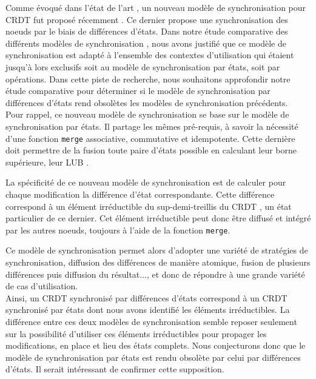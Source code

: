 \label{sec:perspective-comparison-sync-models}
Comme évoqué dans l'état de l'art , un nouveau modèle de synchronisation pour \ac{CRDT} fut proposé récemment \cite{almeida2015delta}.
Ce dernier propose une synchronisation des noeuds par le biais de différences d'états.
Dans notre étude comparative des différents modèles de synchronisation , nous avons justifié que ce modèle de synchronisation est adapté à l'ensemble des contextes d'utilisation qui étaient jusqu'à lors exclusifs soit au modèle de synchronisation par états, soit par opérations.
Dans cette piste de recherche, nous souhaitons approfondir notre étude comparative pour déterminer si le modèle de synchronisation par différences d'états rend obsolètes les modèles de synchronisation précédents. \\

Pour rappel, ce nouveau modèle de synchronisation se base sur le modèle de synchronisation par états.
Il partage les mêmes pré-requis, à savoir la nécessité d'une fonction \texttt{merge} associative, commutative et idempotente.
Cette dernière doit permettre de la fusion toute paire d'états possible en calculant leur borne supérieure, \ie leur \ac{LUB} \cite{2018-crdts-perguica-baquero-shapiro}.

La spécificité de ce nouveau modèle de synchronisation est de calculer pour chaque modification la différence d'état correspondante.
Cette différence correspond à un élément irréductible du sup-demi-treillis du \ac{CRDT} \cite{enes2019}, \ie un état particulier de ce dernier.
Cet élément irréductible peut donc être diffusé et intégré par les autres noeuds, toujours à l'aide de la fonction \texttt{merge}.

Ce modèle de synchronisation permet alors d'adopter une variété de stratégies de synchronisation, \eg diffusion des différences de manière atomique, fusion de plusieurs différences puis diffusion du résultat..., et donc de répondre à une grande variété de cas d'utilisation.\\

Ainsi, un \ac{CRDT} synchronisé par différences d'états correspond à un \ac{CRDT} synchronisé par états dont nous avons identifié les éléments irréductibles.
La différence entre ces deux modèles de synchronisation semble reposer seulement sur la possibilité d'utiliser ces éléments irréductibles pour propager les modifications, en place et lieu des états complets.
Nous conjecturons donc que le modèle de synchronisation par états est rendu obsolète par celui par différences d'états.
Il serait intéressant de confirmer cette supposition.\\

